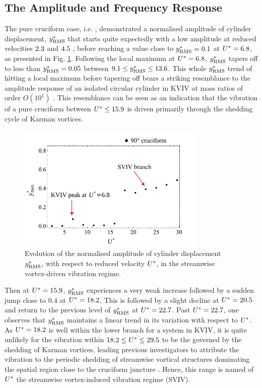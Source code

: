 \documentclass[oneside]{utmthesis}
\begin{document}
\subsection{The Amplitude and Frequency Response}\label{ssec:svivRegimeAmpFreqResp}

The pure cruciform case, i.e. \angfi{}, demonstrated a normalised \rms{} amplitude of cylinder displacement, $y^{*}_{\text{RMS}}$ that starts quite expectedly with a low amplitude at reduced velocities $2.3$ and $4.5$ , before reaching a value close to $y^{*}_{\text{RMS}} = 0.1$ at $U^{*} = 6.8$, as presented in Fig. \ref{fig:yStrRMS1}. Following the local maximum at $U^{*} = 6.8$, $y^{*}_{\text{RMS}}$ tapers off to less than $y^{*}_{\text{RMS}} = 0.05$ between $9.1 \leq y^{*}_{\text{RMS}} \leq 13.6$. This whole $y^{*}_{\text{RMS}}$ trend of hitting a local maximum before tapering off bears a striking resemblance to the amplitude response of an isolated circular cylinder in KVIV at mass ratios of order $O(10^{1})$ \citep{Feng1963,Khalak1999}. This resemblance can be seen as an indication that the vibration of a pure cruciform between $U^{*} \leq 15.9$ is driven primarily through the shedding cycle of Karman vortices.

\begin{figure}[!h]
  \centering
  \includegraphics[width=0.8\textwidth]{figs/yStrRMS1}
  \caption{Evolution of the normalised \rms{} amplitude of cylinder displacement $y^{*}_{\text{RMS}}$, with respect to reduced velocity $U^{*}$, in the streamwise vortex-driven vibration regime.} \label{fig:yStrRMS1}
\end{figure}

Then at $U^{*} = 15.9$, $y^{*}_{\text{RMS}}$ experiences a very weak increase followed by a sudden jump close to $0.4$ at $U^{*} = 18.2$. This is followed by a slight decline at $U^{*} = 20.5$ and return to the previous level of $y^{*}_{\text{RMS}}$ at $U^{*} = 22.7$. Past $U^{*} = 22.7$, one observes that $y^{*}_{\text{RMS}}$ maintains a linear trend in its variation with respect to $U^{*}$. As $U^{*} = 18.2$ is well within the lower branch for a system in KVIV, it is quite unlikely for the vibration within $18.2 \leq U^{*} \leq 29.5$ to be the governed by the shedding of Karman vortices, leading previous investigators to attribute the vibration to the periodic shedding of streamwise vortical structures dominating the spatial region close to the cruciform juncture \citep{Shirakashi1989,Hemsuwan2018b,Hemsuwan2018d}. Hence, this range is named of $U^{*}$ the streamwise vortex-induced vibration regime (SVIV).
\end{document}
